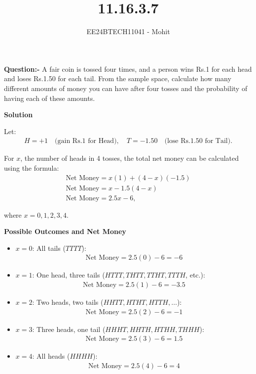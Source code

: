 \documentclass[journal]{IEEEtran}
\numberwithin{equation}{enumi}
\numberwithin{figure}{enumi}
\begin{document}

\title{11.16.3.7}
\author{EE24BTECH11041 - Mohit}
{\let\newpage\relax\maketitle}
\textbf{Question:-} A fair coin is tossed four times, and a person wins Rs.1 for each head and loses Rs.1.50 for each tail. From the sample space, calculate how many different amounts of money you can have after four tosses and the probability of having each of these amounts.

\textbf{Solution}

Let:
\begin{align}
H = +1 \quad \text{(gain Rs.1 for Head)}, \quad T = -1.50 \quad \text{(lose Rs.1.50 for Tail)}.
\end{align}

For $ x $, the number of heads in 4 tosses, the total net money can be calculated using the formula:
\begin{align}
\text{Net Money} = x(1) + (4-x)(-1.5)\\
\text{Net Money} = x - 1.5(4-x)\\
\text{Net Money} = 2.5x - 6,
\end{align}

where $ x = 0, 1, 2, 3, 4 $.

\textbf{Possible Outcomes and Net Money}

\begin{itemize}
    \item $ x = 0 $: All tails ($ TTTT $):
    \begin{align}
    \text{Net Money} = 2.5(0) - 6 = -6
    \end{align}
    \item $ x = 1 $: One head, three tails ($ HTTT, THTT, TTHT, TTTH $, etc.):
    \begin{align}
    \text{Net Money} = 2.5(1) - 6 = -3.5
    \end{align}
    \item $ x = 2 $: Two heads, two tails ($ HHTT, HTHT, HTTH, \dots $):
    \begin{align}
    \text{Net Money} = 2.5(2) - 6 = -1
    \end{align}
    \item $ x = 3 $: Three heads, one tail ($ HHHT, HHTH, HTHH, THHH $):
    \begin{align}
    \text{Net Money} = 2.5(3) - 6 = 1.5
    \end{align}
    \item $ x = 4 $: All heads ($ HHHH $):
    \begin{align}
    \text{Net Money} = 2.5(4) - 6 = 4
    \end{align}
\end{itemize}
\end{document}
